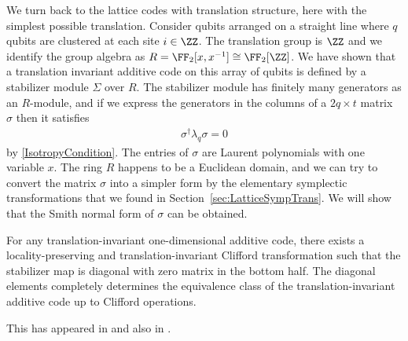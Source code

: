 We turn back to the lattice codes with translation structure,
here with the simplest possible translation.
Consider qubits arranged on a straight line
where $q$ qubits are clustered at each site $i \in \ZZ$.
The translation group is $\ZZ$ 
and we identify the group algebra as $R=\FF_2[x,x^{-1}] \cong \FF_2 [\ZZ]$.
We have shown that
a translation invariant additive code on this array of qubits is defined by
a stabilizer module $\Sigma$ over $R$.
The stabilizer module has finitely many generators as an $R$-module,
and if we express the generators in the columns of a $2q \times t$ matrix $\sigma$
then it satisfies
\begin{align}
 \sigma^\dagger \lambda_q \sigma = 0
\end{align}
by \ref{IsotropyCondition}.
The entries of $\sigma$ are Laurent polynomials with one variable $x$.
The ring $R$ happens to be a Euclidean domain,
and we can try to convert the matrix $\sigma$ into a simpler form
by the elementary symplectic transformations that we found in Section~\ref{sec:LatticeSympTrans}.
We will show that the Smith normal form of $\sigma$ can be obtained.
\begin{prop}
For any translation-invariant one-dimensional additive code,
there exists a locality-preserving and translation-invariant 
Clifford transformation such that
the stabilizer map is diagonal with zero matrix in the bottom half.
The diagonal elements completely determines the equivalence class
of the translation-invariant additive code up to Clifford operations.
\label{1Dpreclassification}
\end{prop}
This has appeared in \cite{GrasslRoetteler2006Convolutional} and also in \cite{Haah2012PauliModule}.
